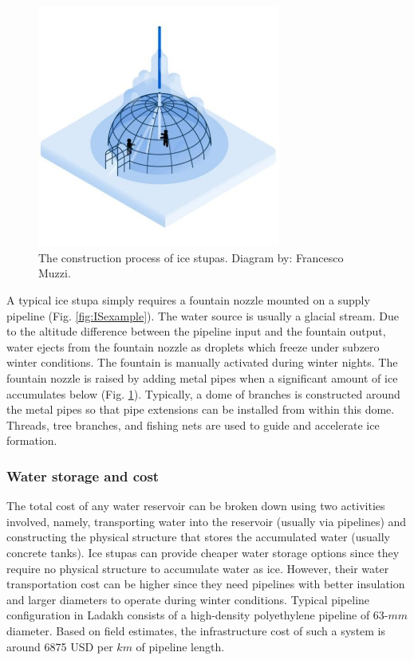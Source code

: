\begin{figure}[htb]
	\centering
	\includegraphics[width=8cm]{figs/IS_science.jpg}
	\caption{The construction process of ice stupas. Diagram by: Francesco Muzzi. }
	\label{fig:ISconstruction}
\end{figure}

A typical ice stupa simply requires a fountain nozzle mounted on a supply pipeline (Fig. \ref{fig:ISexample}).
The water source is usually a glacial stream. Due to the altitude difference between the pipeline input and the
fountain output, water ejects from the fountain nozzle as droplets which freeze under subzero winter conditions.
The fountain is manually activated during winter nights. The fountain nozzle is raised by adding
metal pipes when a significant amount of ice accumulates below (Fig. \ref{fig:ISconstruction}). Typically, a dome of
branches is constructed around the metal pipes so that pipe extensions can be installed from within this dome.
Threads, tree branches, and fishing nets are used to guide and accelerate ice formation.

\subsubsection{Water storage and cost}
\label{sec:icestupa_irr}

The total cost of any water reservoir can be broken down using two activities involved, namely, transporting water into the reservoir (usually via pipelines) and constructing the physical structure that stores the accumulated water (usually concrete tanks). Ice stupas can provide cheaper water storage options since they require no physical structure to accumulate water as ice. However, their water transportation cost can be higher since they need pipelines with better insulation and larger diameters to operate during winter conditions. Typical pipeline configuration in Ladakh consists of a high-density polyethylene pipeline of 63-$mm$ diameter. Based on field estimates, the infrastructure cost of such a
system is around 6875 USD per $km$ of pipeline length.


